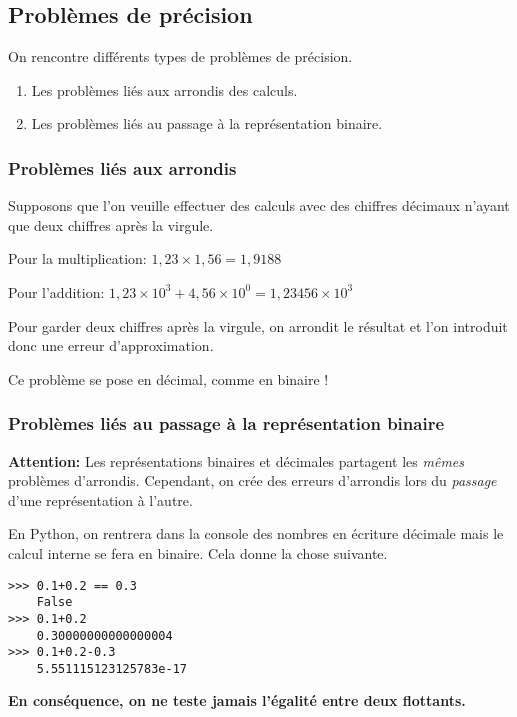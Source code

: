 \subsection{Problèmes de précision}

On rencontre différents types de problèmes de précision.
\begin{enumerate}
\item Les problèmes liés aux arrondis des calculs.
\item Les problèmes liés au passage à la représentation binaire.
\end{enumerate}

\subsubsection{Problèmes liés aux arrondis}
Supposons que l'on veuille effectuer des calculs avec des chiffres décimaux n'ayant que deux chiffres après la virgule.
\begin{exemple}
Pour la multiplication:
$1,23\times 1,56 = 1,9188$
\end{exemple}
\begin{exemple}
Pour l'addition:
$1,23\times 10^{3} + 4,56\times 10^{0} = 1,23456\times 10^{3}$
\end{exemple}
Pour garder deux chiffres après la virgule, on arrondit le résultat et l'on introduit donc une erreur d'approximation.

Ce problème se pose en décimal, comme en binaire !

\subsubsection{Problèmes liés au passage à la représentation binaire}

\textbf{Attention:}
Les représentations binaires et décimales partagent les \emph{mêmes} problèmes d'arrondis. 
Cependant, on crée des erreurs d'arrondis lors du \emph{passage} d'une représentation à l'autre.
\begin{exemple}
En Python, on rentrera dans la console des nombres en écriture décimale mais le calcul interne se fera en binaire. Cela donne la chose suivante.
\begin{lstlisting}
>>> 0.1+0.2 == 0.3
	False
>>> 0.1+0.2
	0.30000000000000004
>>> 0.1+0.2-0.3
	5.551115123125783e-17
\end{lstlisting}
\end{exemple}

\textbf{En conséquence, on ne teste jamais l'égalité entre deux flottants.}

